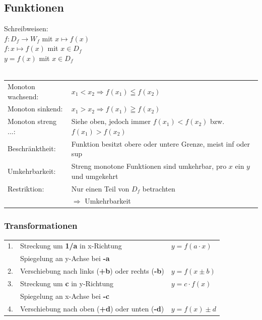 			
			
			
		\subsection{Funktionen}

			Schreibweisen: \\
			$f:D_f \rightarrow W_f$ mit $x \mapsto f(x)$\\
			$f:x \mapsto f(x)$ mit $x \in D_f$\\
			$y=f(x)$ mit $x \in D_f$		 \\	
			\\
			\begin{tabular}{ll}
			Monoton wachsend: & $x_1 < x_2 \Rightarrow f(x_1) \leqq f(x_2)$ \\
            Monoton sinkend: & $x_1 > x_2 \Rightarrow f(x_1) \geqq f(x_2)$ \\
            Monoton streng ...: & Siehe oben, jedoch immer $f(x_1) < f(x_2)$ bzw. $f(x_1) > f(x_2)$ \\
			Beschränktheit: & Funktion besitzt obere oder untere Grenze, meist inf oder sup \\
			Umkehrbarkeit: & Streng monotone Funktionen sind umkehrbar, pro $x$ ein $y$ und umgekehrt \\
			Restriktion: & Nur einen Teil von $D_f$ betrachten \\ 
			 & $\Rightarrow$ Umkehrbarkeit\\
			\end{tabular}
					
			
		    \subsubsection{Transformationen}	
			\begin{tabular}{lll}
			1. & Streckung um \textbf{1/a} in x-Richtung & $y = f(a \cdot x)$ \\
			 & Spiegelung an y-Achse bei \textbf{-a} & \\
			2. & Verschiebung nach links (\textbf{+b}) oder rechts  (\textbf{-b}) & $y = f(x \pm b)$\\
			3. & Streckung um \textbf{c} in y-Richtung & $y = c \cdot f(x)$ \\
			 & Spiegelung an x-Achse bei \textbf{-c} & \\
			4. & Verschiebung nach oben (\textbf{+d}) oder unten (\textbf{-d}) & $y = f(x) \pm d $ \\
			
			\end{tabular}
			

